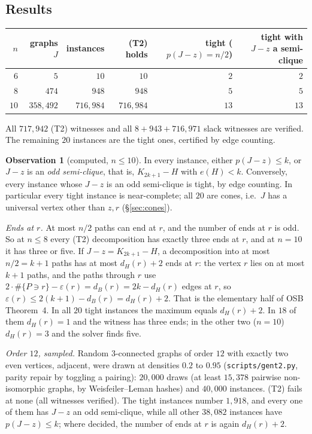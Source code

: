 \documentclass[11pt]{amsart}
\theoremstyle{definition}
\newtheorem{observation}[theorem]{Observation}
\theoremstyle{remark}
\renewcommand{\_}{\oldunderscore\allowbreak}
\newcommand{\TWELVEGRAPHS}{$20{,}000$}
\newcommand{\TWELVEINST}{$40{,}000$}
\newcommand{\TWELVETIGHT}{$1{,}918$, and every one of them has $J-z$ an odd semi-clique, while all other $38{,}082$ instances have $p(J-z)\le k$; where decided, the number of ends at $r$ is again $d_H(r)+2$}
\newcommand{\TWELVEFAIL}{none (all witnesses verified)}
\begin{document}
\subsection{Results}
\begin{center}
\begin{tabular}{rrrrrr}
\toprule
$n$ & graphs $J$ & instances & (T2) holds & tight ($p(J-z)=n/2$) & tight with $J-z$ a semi-clique\\
\midrule
$6$ & $5$ & $10$ & $10$ & $2$ & $2$\\
$8$ & $474$ & $948$ & $948$ & $5$ & $5$\\
$10$ & $358{,}492$ & $716{,}984$ & $716{,}984$ & $13$ & $13$\\
\bottomrule
\end{tabular}
\end{center}
All $717{,}942$ (T2) witnesses and all $8+943+716{,}971$ slack witnesses are verified. The
remaining $20$ instances are the tight ones, certified by edge counting.

\begin{observation}[computed, $n\le 10$]\label{obs:tight}
In every instance, either $p(J-z)\le k$, or $J-z$ is an \emph{odd semi-clique}, that is, $K_{2k+1}-H$
with $e(H)<k$. Conversely, every instance whose $J-z$ is an odd semi-clique is tight, by edge
counting. In particular every tight instance is near-complete; all $20$ are cones, i.e.\ $J$ has a
universal vertex other than $z,r$ (\S\ref{sec:cones}).
\end{observation}

\emph{Ends at $r$.} At most $n/2$ paths can end at $r$, and the number of ends at $r$ is odd. So at
$n\le 8$ every (T2) decomposition has exactly three ends at $r$, and at $n=10$ it has three or five.
If $J-z=K_{2k+1}-H$, a decomposition into at most $n/2=k+1$ paths has at most
$d_H(r)+2$ ends at $r$: the vertex $r$ lies on at most $k+1$ paths, and the paths through $r$ use
$2\cdot\#\{P\ni r\}-\varepsilon(r)=d_B(r)=2k-d_H(r)$ edges at $r$, so
$\varepsilon(r)\le 2(k+1)-d_B(r)=d_H(r)+2$. That is the elementary half of OSB Theorem~4. In all $20$ tight instances the maximum equals $d_H(r)+2$. In $18$ of them $d_H(r)=1$ and the
witness has three ends; in the other two ($n=10$) $d_H(r)=3$ and the solver finds five.

\emph{Order $12$, sampled.} Random $3$-connected graphs of order $12$ with exactly two even vertices,
adjacent, were drawn at densities $0.2$ to $0.95$ (\texttt{scripts/gen\_t2.py}, parity repair by
toggling a pairing): \TWELVEGRAPHS{} draws (at least $15{,}378$ pairwise non-isomorphic graphs, by
Weisfeiler--Leman hashes) and \TWELVEINST{} instances. (T2) fails at \TWELVEFAIL{}. The tight instances
number \TWELVETIGHT{}.
\end{document}

